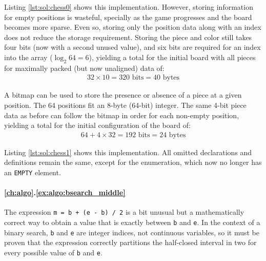 Listing \ref{lst:sol:chess0} shows this implementation.  However, storing
information for empty positions is wasteful, specially as the game progresses
and the board becomes more sparse.  Even so, storing only the position data
along with an index does not reduce the storage requirement.  Storing the piece
and color still takes four bits (now with a second unused value), and six bits
are required for an index into the array ($\log_2 64 = 6$), yielding a total for
the initial board with all pieces for maximally packed (but now unaligned) data
of:
\begin{align*}
    32 \times 10 = 320\text{ bits} = 40\text{ bytes}
\end{align*}

A bitmap can be used to store the presence or absence of a piece at a given
position.  The 64 positions fit an 8-byte (64-bit) integer.  The same 4-bit
piece data as before can follow the bitmap in order for each non-empty position,
yielding a total for the initial configuration of the board of:
\begin{align*}
    64 + 4 \times 32 = 192\text{ bits} = 24\text{ bytes}
\end{align*}

Listing \ref{lst:sol:chess1} shows this implementation.  All omitted
declarations and definitions remain the same, except for the enumeration, which
now no longer has an \texttt{EMPTY} element.

\begin{figure}[p]
    
    
\end{figure}

\paragraph{\ref{ch:algo}.\ref{ex:algo:bsearch_middle}}

The expression \texttt{m = b + (e - b) / 2} is a bit unusual but a
mathematically correct way to obtain a value that is exactly between \texttt{b}
and \texttt{e}.  In the context of a binary search, \texttt{b} and \texttt{e}
are integer indices, not continuous variables, so it must be proven that the
expression correctly partitions the half-closed interval in two for every
possible value of \texttt{b} and \texttt{e}.

